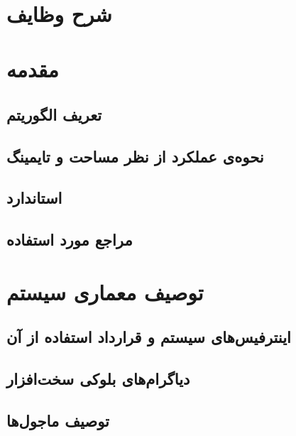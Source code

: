 \documentclass[]{article}
\begin{document}
	
\begin{titlepage}
\begin{center}
\heading
\end{center}
\end{titlepage}


\newpage
\pageheader
\tableofcontents

\newpage

 \Large \textbf{\\}

\section{شرح وظایف}

\pagebreak

\section{مقدمه}

\subsection{تعریف الگوریتم}
\subsection{نحوه‌ی عملکرد از نظر مساحت و تایمینگ}
\subsection{استاندارد‌ }
\subsection{مراجع مورد استفاده}

\pagebreak
\section{توصیف معماری سیستم}
\subsection{اینترفیس‌های سیستم و قرارداد استفاده از آن }
\subsection{دیاگرام‌های بلوکی سخت‌افزار}
\subsection{توصیف ماجول‌ها}
\end{document}
